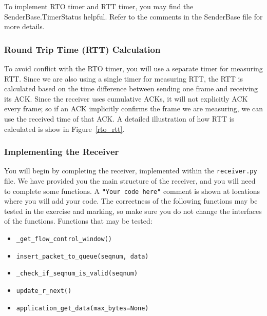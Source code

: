 \documentclass[11pt]{article}
\begin{document}
To implement RTO timer and RTT timer, you may find the SenderBase.TimerStatus helpful. Refer to the comments in the SenderBase file for more details.

\subsubsection{Round Trip Time (RTT) Calculation}

To avoid conflict with the RTO timer, you will use a separate timer for measuring RTT. Since we are also using a single timer for measuring RTT, the RTT is calculated based on the time difference between sending one frame and receiving its ACK. Since the receiver uses cumulative ACKs, it will not explicitly ACK every frame; so if an ACK implicitly confirms the frame we are measuring, we can use the received time of that ACK. A detailed illustration of how RTT is calculated is show in Figure~\ref{rto_rtt}.





\subsubsection{Implementing the Receiver}
You will begin by completing the receiver, implemented within the \texttt{receiver.py} file. We have provided you the main structure of the receiver, and you will need to complete some functions. A \texttt{"Your code here"} comment is shown at locations where you will add your code. The correctness of the following functions may be tested in the exercise and marking, so make sure you do not change the interfaces of the functions.
Functions that may be tested:
\begin{itemize}
    \item \texttt{\_get\_flow\_control\_window()}
    \item \texttt{insert\_packet\_to\_queue(seqnum, data)}
    \item \texttt{\_check\_if\_seqnum\_is\_valid(seqnum)}
    \item \texttt{update\_r\_next()}
    \item \texttt{application\_get\_data(max\_bytes=None)}
\end{itemize}
\end{document}
